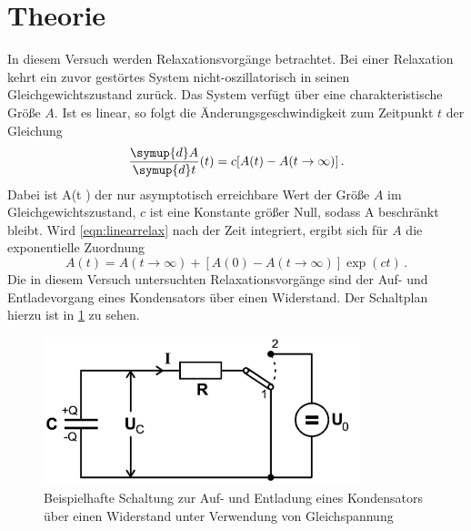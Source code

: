 \section{Theorie}
In diesem Versuch werden Relaxationsvorgänge betrachtet. Bei einer Relaxation kehrt
ein zuvor gestörtes System nicht-oszillatorisch in seinen Gleichgewichtszustand
zurück. Das System verfügt über eine charakteristische Größe $A$. Ist es linear,
so folgt die Änderungsgeschwindigkeit zum Zeitpunkt $t$ der Gleichung
\begin{equation}
  \frac{\symup{d}A}{\symup{d}t}(t) = c[A(t)-A(t \to \infty)]\,.
  \label{eqn:linearrelax}
\end{equation}
Dabei ist A(t \to \infty) der nur asymptotisch erreichbare Wert der Größe $A$ im
Gleichgewichtszustand, $c$ ist eine Konstante größer Null, sodass A beschränkt
bleibt.
Wird \eqref{eqn:linearrelax} nach der Zeit integriert, ergibt sich für $A$ die
exponentielle Zuordnung
\begin{equation}
  A(t) = A(t \to \infty) + [A(0) - A(t \to \infty)] \exp(ct)\,.
\end{equation}
Die in diesem Versuch untersuchten Relaxationsvorgänge sind der Auf- und Entladevorgang
eines Kondensators über einen Widerstand. Der Schaltplan hierzu ist in \ref{fig:Aufbau_1} zu sehen.
\begin{figure}
  \centering
  \includegraphics[width=260pt]{data/aufbau_1.png}
  \caption{Beispielhafte Schaltung zur Auf- und Entladung eines Kondensators über einen
  Widerstand unter Verwendung von Gleichspannung \cite{Versuchsanleitung}}
  \label{fig:Aufbau_1}
\end{figure}


